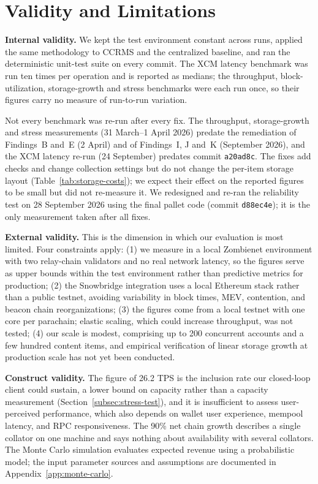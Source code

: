 \section{Validity and Limitations}\label{sec:validity}

\textbf{Internal validity.} We kept the test environment constant across runs, applied the same methodology to CCRMS and the centralized baseline, and ran the deterministic unit-test suite on every commit. The XCM latency benchmark was run ten times per operation and is reported as medians; the throughput, block-utilization, storage-growth and stress benchmarks were each run once, so their figures carry no measure of run-to-run variation.

Not every benchmark was re-run after every fix. The throughput, storage-growth and stress measurements (31 March--1 April 2026) predate the remediation of Findings~B and~E (2 April) and of Findings~I, J and~K (September 2026), and the XCM latency re-run (24 September) predates commit \texttt{a20ad8c}. The fixes add checks and change collection settings but do not change the per-item storage layout (Table~\ref{tab:storage-costs}); we expect their effect on the reported figures to be small but did not re-measure it. We redesigned and re-ran the reliability test on 28 September 2026 using the final pallet code (commit \texttt{d88ec4e}); it is the only measurement taken after all fixes.

\textbf{External validity.} This is the dimension in which our evaluation is most limited. Four constraints apply: (1) we measure in a local Zombienet environment with two relay-chain validators and no real network latency, so the figures serve as upper bounds within the test environment rather than predictive metrics for production; (2) the Snowbridge integration uses a local Ethereum stack rather than a public testnet, avoiding variability in block times, MEV, contention, and beacon chain reorganizations; (3) the figures come from a local testnet with one core per parachain; elastic scaling, which could increase throughput, was not tested; (4) our scale is modest, comprising up to 200 concurrent accounts and a few hundred content items, and empirical verification of linear storage growth at production scale has not yet been conducted.

\textbf{Construct validity.} The figure of 26.2 TPS is the inclusion rate our closed-loop client could sustain, a lower bound on capacity rather than a capacity measurement (Section~\ref{subsec:stress-test}), and it is insufficient to assess user-perceived performance, which also depends on wallet user experience, mempool latency, and RPC responsiveness. The 90\% net chain growth describes a single collator on one machine and says nothing about availability with several collators. The Monte Carlo simulation evaluates expected revenue using a probabilistic model; the input parameter sources and assumptions are documented in Appendix~\ref{app:monte-carlo}.

